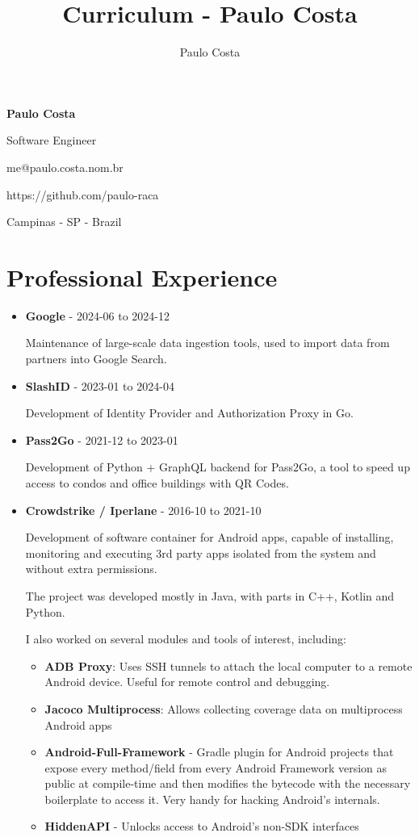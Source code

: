 \documentclass[a4paper,10pt]{article}
\title{Curriculum - Paulo Costa}
\author{Paulo Costa}
\begin{document}
  \LARGE\textbf{Paulo Costa}

  \large Software Engineer

  \large me@paulo.costa.nom.br
  
  \large https://github.com/paulo-raca


  \large Campinas - SP - Brazil

  \normalsize 
  
  \section{Professional Experience}
    \begin{itemize}
      \item
        \textbf{Google} - 2024-06 to 2024-12

        Maintenance of large-scale data ingestion tools, used to import data from partners into Google Search.

      \item
        \textbf{SlashID} - 2023-01 to 2024-04

        Development of Identity Provider and Authorization Proxy in Go.

      \item
        \textbf{Pass2Go} - 2021-12 to 2023-01

        Development of Python + GraphQL backend for Pass2Go, a tool to speed up access to condos and office buildings with QR Codes.

      \item
        \textbf{Crowdstrike / Iperlane} - 2016-10 to 2021-10

        Development of software container for Android apps, capable of installing, monitoring and executing 3rd
        party apps isolated from the system and without extra permissions.
        
        The project was developed mostly in Java, with parts in C++, Kotlin and Python.

        I also worked on several modules and tools of interest, including:

        \begin{itemize}
          \item \textbf{ADB Proxy}: Uses SSH tunnels to attach the local computer to a remote Android device. Useful for remote control and debugging.
          \item \textbf{Jacoco Multiprocess}: Allows collecting coverage data on multiprocess Android apps
          \item \textbf{Android-Full-Framework} - Gradle plugin for Android projects that expose every method/field from every Android Framework version as public at compile-time and then modifies the bytecode with the necessary boilerplate to access it. Very handy for hacking Android's internals.
          \item \textbf{HiddenAPI} - Unlocks access to Android's non-SDK interfaces
        \end{itemize}


\end{itemize}
\end{document}
